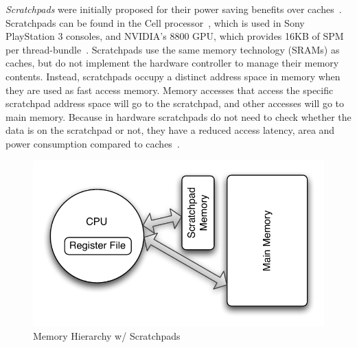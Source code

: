 \emph{Scratchpads} were initially proposed for their power saving benefits over caches~\cite{Banakar2002}.
Scratchpads can be found in the Cell processor~\cite{cellproc}, which is used in Sony PlayStation 3 consoles, and NVIDIA's 8800 GPU, which provides 16KB of SPM per thread-bundle~\cite{8800gpu}.
Scratchpads use the same memory technology (SRAMs) as caches, but do not implement the hardware controller to manage their memory contents.
Instead, scratchpads occupy a distinct address space in memory when they are used as fast access memory.
Memory accesses that access the specific scratchpad address space will go to the scratchpad, and other accesses will go to main memory. 
Because in hardware scratchpads do not need to check whether the data is on the scratchpad or not, they have a reduced access latency, area and power consumption compared to caches~\cite{Banakar2002}. 

\begin{figure}
  \vspace{-20pt}
  \begin{center}
    \includegraphics[scale=.5]{figs/pret_mem_hierarchy}
  \end{center}
  \vspace{-10pt}
  \caption{Memory Hierarchy w/ Scratchpads}
  \label{fig:pret_mem_hierarchy}
\end{figure}   

